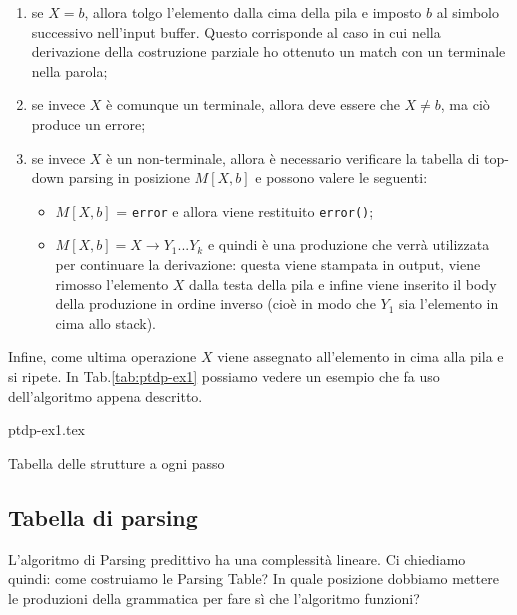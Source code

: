 \documentclass[class=book, crop=false, oneside, 12pt]{standalone}
\begin{document}
\begin{enumerate}
    \item se \(X = b\), allora tolgo l'elemento dalla cima della pila e imposto \(b\) al simbolo successivo nell'input buffer. Questo corrisponde al caso in cui nella derivazione della costruzione parziale ho ottenuto un match con un terminale nella parola;
    \item se invece \(X\) è comunque un terminale, allora deve essere che \(X \neq b\), ma ciò produce un errore;
    \item se invece \(X\) è un non-terminale, allora è necessario verificare la tabella di top-down parsing in posizione \(M[X, b]\) e possono valere le seguenti:
    \begin{itemize}
        \item \(M[X, b]\) = \texttt{error} e allora viene restituito \texttt{error()};
        \item \(M[X, b] = X \rightarrow Y_1...Y_k\) e quindi è una produzione che verrà utilizzata per continuare la derivazione: questa viene stampata in output, viene rimosso l'elemento \(X\) dalla testa della pila e infine viene inserito il body della produzione in ordine inverso (cioè in modo che \(Y_1\) sia l'elemento in cima allo stack).
    \end{itemize}
\end{enumerate}

Infine, come ultima operazione \(X\) viene assegnato all'elemento in cima alla pila e si ripete. In Tab.\ref{tab:ptdp-ex1} possiamo vedere un esempio che fa uso dell'algoritmo appena descritto.
\begin{table}[H]
	\centering
	{ptdp-ex1.tex}
    \caption{Tabella delle strutture a ogni passo}
    \label{tab:ptdp-ex1}
\end{table} 

\subsection{Tabella di parsing}

L'algoritmo di Parsing predittivo ha una complessità lineare. Ci chiediamo quindi: come costruiamo le Parsing Table? In quale posizione dobbiamo mettere le produzioni della grammatica per fare sì che l'algoritmo funzioni?
\end{document}

